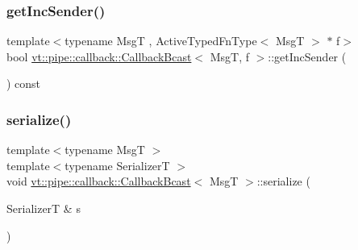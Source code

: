 \subsubsection{\texorpdfstring{get\+Inc\+Sender()}{getIncSender()}}
{\footnotesize\ttfamily template$<$typename MsgT , Active\+Typed\+Fn\+Type$<$ Msg\+T $>$ $\ast$ f$>$ \\
bool \hyperlink{structvt_1_1pipe_1_1callback_1_1_callback_bcast}{vt\+::pipe\+::callback\+::\+Callback\+Bcast}$<$ MsgT, f $>$\+::get\+Inc\+Sender (\begin{DoxyParamCaption}{ }\end{DoxyParamCaption}) const\hspace{0.3cm}{\ttfamily [inline]}}

\mbox{\label{structvt_1_1pipe_1_1callback_1_1_callback_bcast_a2337a0d2bda968f7ab1e4c85c3dbe67a}} 
\subsubsection{\texorpdfstring{serialize()}{serialize()}}
{\footnotesize\ttfamily template$<$typename MsgT $>$ \\
template$<$typename SerializerT $>$ \\
void \hyperlink{structvt_1_1pipe_1_1callback_1_1_callback_bcast}{vt\+::pipe\+::callback\+::\+Callback\+Bcast}$<$ MsgT $>$\+::serialize (\begin{DoxyParamCaption}\item[{SerializerT \&}]{s }\end{DoxyParamCaption})}

\mbox{\label{structvt_1_1pipe_1_1callback_1_1_callback_bcast_a839f195f5e4dae3251d67163016ae703}} 
